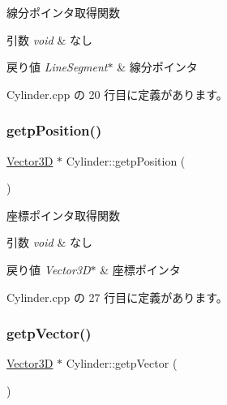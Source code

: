 線分ポインタ取得関数 


\begin{DoxyParams}{引数}
{\em void} & なし \\
\hline
\end{DoxyParams}

\begin{DoxyRetVals}{戻り値}
{\em Line\+Segment$\ast$} & 線分ポインタ \\
\hline
\end{DoxyRetVals}


 Cylinder.\+cpp の 20 行目に定義があります。

\mbox{\label{class_cylinder_abf7bd0ec7c85488de892601bc9e23e94}} 
\subsubsection{\texorpdfstring{getp\+Position()}{getpPosition()}}
{\footnotesize\ttfamily \mbox{\hyperlink{class_vector3_d}{Vector3D}} $\ast$ Cylinder\+::getp\+Position (\begin{DoxyParamCaption}{ }\end{DoxyParamCaption})}



座標ポインタ取得関数 


\begin{DoxyParams}{引数}
{\em void} & なし \\
\hline
\end{DoxyParams}

\begin{DoxyRetVals}{戻り値}
{\em Vector3\+D$\ast$} & 座標ポインタ \\
\hline
\end{DoxyRetVals}


 Cylinder.\+cpp の 27 行目に定義があります。

\mbox{\label{class_cylinder_a81a0ee46547b6c2e4e10fc821389f377}} 
\subsubsection{\texorpdfstring{getp\+Vector()}{getpVector()}}
{\footnotesize\ttfamily \mbox{\hyperlink{class_vector3_d}{Vector3D}} $\ast$ Cylinder\+::getp\+Vector (\begin{DoxyParamCaption}{ }\end{DoxyParamCaption})}



